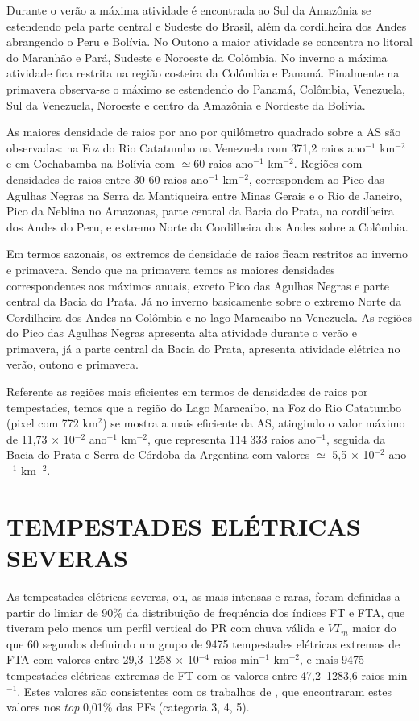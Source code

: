 Durante o verão a máxima atividade é encontrada ao Sul da Amazônia se estendendo pela parte central e Sudeste do Brasil, além da cordilheira dos Andes abrangendo o Peru e Bolívia. No Outono a maior atividade se concentra no litoral do Maranhão e Pará, Sudeste e Noroeste  da Colômbia. No inverno a máxima atividade  fica restrita na região costeira da Colômbia e Panamá. Finalmente na primavera observa-se o máximo se estendendo do Panamá, Colômbia, Venezuela, Sul da Venezuela, Noroeste e centro da Amazônia e Nordeste da Bolívia. 
 
As maiores densidade de raios por ano por quilômetro quadrado sobre a AS são observadas: na Foz do Rio Catatumbo na Venezuela com 371,2 raios ano$^{-1}$ km$^{-2}$ e em Cochabamba na Bolívia com $\simeq$60  raios ano$^{-1}$ km$^{-2}$. Regiões com densidades de raios entre 30-60 raios ano$^{-1}$ km$^{-2}$, correspondem ao Pico das Agulhas Negras na Serra da Mantiqueira entre Minas Gerais e o Rio de Janeiro, Pico da Neblina no Amazonas, parte central da Bacia do Prata, na cordilheira dos Andes do Peru, e extremo Norte da Cordilheira dos Andes sobre a Colômbia. 

Em termos sazonais, os extremos de densidade de raios ficam restritos ao inverno e primavera. Sendo que na primavera temos as maiores densidades correspondentes aos máximos anuais, exceto Pico das Agulhas Negras e parte central da Bacia do Prata. Já no inverno basicamente sobre o extremo Norte da Cordilheira dos Andes na Colômbia e no lago Maracaibo na Venezuela. As regiões do Pico das Agulhas Negras apresenta alta atividade durante o verão e primavera, já  a parte central da Bacia do Prata, apresenta atividade elétrica  no verão, outono e primavera.


Referente as regiões mais eficientes em termos de densidades de raios por tempestades, temos que a região do Lago Maracaibo, na Foz do Rio Catatumbo (pixel com 772 km$^{2}$) se mostra a mais eficiente da AS, atingindo o valor máximo de 11,73 $\times$ 10$^{-2}$ ano$^{-1}$ km$^{-2}$, que representa {114 333} raios ano$^{-1}$, seguida da Bacia do Prata e Serra de Córdoba da Argentina com valores $\simeq$ 5,5 $\times$ 10$^{-2}$ ano$^{-1}$ km$^{-2}$.


\section{TEMPESTADES ELÉTRICAS SEVERAS}

As tempestades elétricas severas, ou, as mais intensas e raras, foram definidas a partir do limiar de 90\% da distribuição de frequência dos índices FT e FTA, que tiveram pelo menos um perfil vertical do PR com chuva válida e $VT_m$ maior do que 60 segundos  definindo um grupo de 9475 tempestades elétricas extremas de FTA com valores entre 29,3--1258 $\times$ 10$^{-4}$ raios min$^{-1}$ km$^{-2}$, e mais 9475 tempestades elétricas extremas de FT com os valores entre 47,2--1283,6 raios min$^{-1}$.  Estes valores são consistentes com os trabalhos de , que encontraram estes valores nos \textit{top} 0,01\% das PFs (categoria 3, 4, 5).


